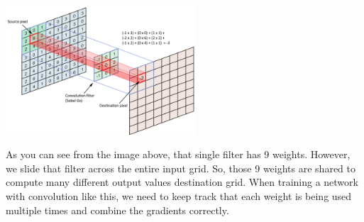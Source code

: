 \begin{center}
    \includegraphics[width=200pt]{lectures/03-a/images/conv.png}
\end{center}

As you can see from the image above, that single filter has 9 weights. However, we slide that filter across the entire input grid. So, those 9 weights are shared to compute many different output values destination grid. When training a network with convolution like this, we need to keep track that each weight is being used multiple times and combine the gradients correctly. 
